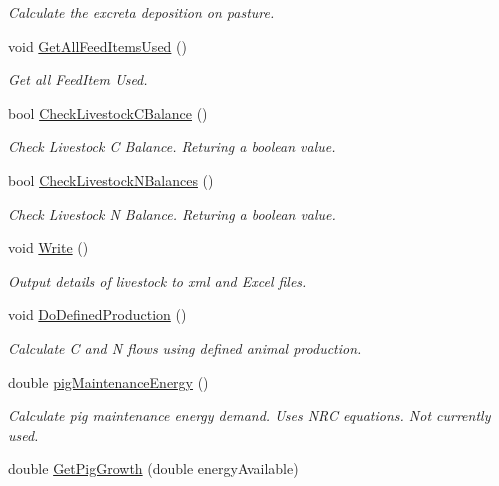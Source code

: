 \begin{DoxyCompactItemize}
\begin{DoxyCompactList}\small\item\em Calculate the excreta deposition on pasture. \end{DoxyCompactList}\item 
void \mbox{\hyperlink{classlivestock_a4c32851ffda591d69f9c5d6914cb6150}{Get\+All\+Feed\+Items\+Used}} ()
\begin{DoxyCompactList}\small\item\em Get all Feed\+Item Used. \end{DoxyCompactList}\item 
bool \mbox{\hyperlink{classlivestock_a4c255fb9cb3d61f425e85e4b7c1cbbbb}{Check\+Livestock\+C\+Balance}} ()
\begin{DoxyCompactList}\small\item\em Check Livestock C Balance. Returing a boolean value. \end{DoxyCompactList}\item 
bool \mbox{\hyperlink{classlivestock_a75c6de36dbd59f4636092f88c8c19798}{Check\+Livestock\+N\+Balances}} ()
\begin{DoxyCompactList}\small\item\em Check Livestock N Balance. Returing a boolean value. \end{DoxyCompactList}\item 
void \mbox{\hyperlink{classlivestock_a3f2eb801302c373964c9c4b665b15cf4}{Write}} ()
\begin{DoxyCompactList}\small\item\em Output details of livestock to xml and Excel files. \end{DoxyCompactList}\item 
void \mbox{\hyperlink{classlivestock_ac40dff6a0a45d6a86ed5348166bd9074}{Do\+Defined\+Production}} ()
\begin{DoxyCompactList}\small\item\em Calculate C and N flows using defined animal production. \end{DoxyCompactList}\item 
double \mbox{\hyperlink{classlivestock_a030909d0ff24a1fcb0a88394033d2cc8}{pig\+Maintenance\+Energy}} ()
\begin{DoxyCompactList}\small\item\em Calculate pig maintenance energy demand. Uses N\+RC equations. Not currently used. \end{DoxyCompactList}\item 
double \mbox{\hyperlink{classlivestock_adffc58e33fd0d59a46ab0b49ce8c0c7b}{Get\+Pig\+Growth}} (double energy\+Available)

\end{DoxyCompactItemize}
